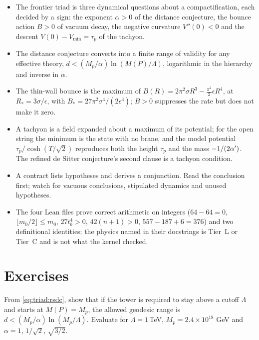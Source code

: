 \begin{summarybox}
\begin{itemize}[leftmargin=*,itemsep=1pt]
\item The frontier triad is three dynamical questions about a compactification, each decided
 by a sign: the exponent $\alpha>0$ of the distance conjecture, the bounce action $B>0$ of vacuum
 decay, the negative curvature $V''(0)<0$ and the descent $V(0)-V_{\min}=\tau_p$ of the tachyon.
\item The distance conjecture converts into a finite range of validity for any effective theory,
 $d<(M_p/\alpha)\ln(M(P)/\Lambda)$, logarithmic in the hierarchy and inverse in $\alpha$.
\item The thin-wall bounce is the maximum of $B(R)=2\pi^2\sigma R^3-\tfrac{\pi^2}{2}\epsilon R^4$,
 at $R_*=3\sigma/\epsilon$, with $B_*=27\pi^2\sigma^4/(2\epsilon^3)$; $B>0$ suppresses the rate
 but does not make it zero.
\item A tachyon is a field expanded about a maximum of its potential; for the open string the
 minimum is the state with no brane, and the model potential $\tau_p/\cosh(T/\sqrt2)$ reproduces
 both the height $\tau_p$ and the mass $-1/(2\alpha')$. The refined de Sitter conjecture's second
 clause is a tachyon condition.
\item A contract lists hypotheses and derives a conjunction. Read the conclusion first; watch
 for vacuous conclusions, stipulated dynamics and unused hypotheses.
\item The four Lean files prove correct arithmetic on integers ($64-64=0$,
 $\lfloor m_0/2\rfloor\le m_0$, $27t_b^4>0$, $42(n+1)>0$, $557-187+6=376$) and two
 definitional identities; the physics named in their docstrings is Tier~L or Tier~C and is not
 what the kernel checked.
\end{itemize}
\end{summarybox}

\section*{Exercises}

\begin{exercise}[$\star$]
From \eqref{eq:triad:rsdc}, show that if the tower is required to stay above a cutoff
$\Lambda$ and starts at $M(P)=M_p$, the allowed geodesic range is
$d<(M_p/\alpha)\ln(M_p/\Lambda)$. Evaluate for $\Lambda=1\,$TeV, $M_p=2.4\times10^{18}$ GeV and
$\alpha=1$, $1/\sqrt2$, $\sqrt{3/2}$.
\end{exercise}

